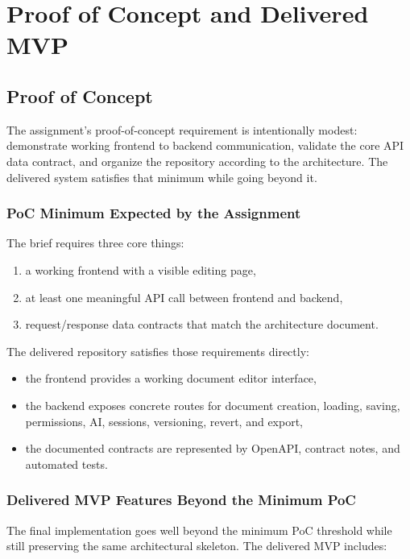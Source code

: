 \part{Proof of Concept and Delivered MVP}

\chapter{Proof of Concept}

The assignment's proof-of-concept requirement is intentionally modest: demonstrate working frontend to
backend communication, validate the core API data contract, and organize the repository according to the
architecture. The delivered system satisfies that minimum while going beyond it.

\section{PoC Minimum Expected by the Assignment}

The brief requires three core things:

\begin{enumerate}
  \item a working frontend with a visible editing page,
  \item at least one meaningful API call between frontend and backend,
  \item request/response data contracts that match the architecture document.
\end{enumerate}

The delivered repository satisfies those requirements directly:

\begin{itemize}
  \item the frontend provides a working document editor interface,
  \item the backend exposes concrete routes for document creation, loading, saving, permissions, AI,
  sessions, versioning, revert, and export,
  \item the documented contracts are represented by OpenAPI, contract notes, and automated tests.
\end{itemize}

\section{Delivered MVP Features Beyond the Minimum PoC}

The final implementation goes well beyond the minimum PoC threshold while still preserving the same
architectural skeleton. The delivered MVP includes:

